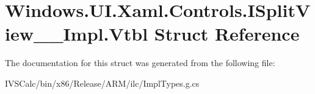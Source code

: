 \hypertarget{struct_windows_1_1_u_i_1_1_xaml_1_1_controls_1_1_i_split_view_____impl_1_1_vtbl}{}\section{Windows.\+U\+I.\+Xaml.\+Controls.\+I\+Split\+View\+\_\+\+\_\+\+Impl.\+Vtbl Struct Reference}
\label{struct_windows_1_1_u_i_1_1_xaml_1_1_controls_1_1_i_split_view_____impl_1_1_vtbl}


The documentation for this struct was generated from the following file\+:\begin{DoxyCompactItemize}
\item 
I\+V\+S\+Calc/bin/x86/\+Release/\+A\+R\+M/ilc/Impl\+Types.\+g.\+cs\end{DoxyCompactItemize}
